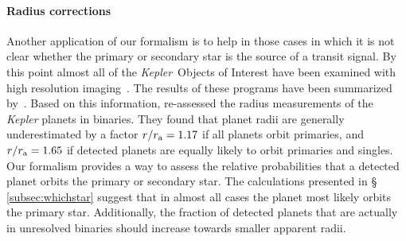 \documentclass[12pt,modern]{aastex61}
\renewcommand{\a}{_{\rm a}}
\begin{document}
\paragraph{Radius corrections} Another application of our formalism is
to help in those cases in which it is not clear whether the primary or
secondary star is the source of a transit signal.  By this point
almost all of the {\it Kepler}\ Objects of Interest have been examined
with high resolution imaging~\citep{
  howell_speckle_2011,adams_adaptive_2012,adams_adaptive_2013,horch_observations_2012,
  horch_most_2014,lillo-box_multiplicity_2012,lillo-box_high-resolution_2014,dressing_adaptive_2014,
  law_robotic_2014,cartier_revision_2015,everett_high-resolution_2015,gilliland_hubble_2015,
  wang_influence_2015,wang_influence_2015-1,baranec_robo-ao_2016,ziegler_robo-ao_2017}.
The results of these programs have been summarized
by~\citet{furlan_kepler_2017}. Based on this information,
\citet{hirsch_assessing_2017} re-assessed the radius measurements of
the {\it Kepler} planets in binaries. They found that planet radii are
generally underestimated by a factor $r/r\a = 1.17$ if all planets
orbit primaries, and $r/r\a = 1.65$ if detected planets are equally
likely to orbit primaries and singles.  Our formalism provides a way
to assess the relative probabilities that a detected planet orbits the
primary or secondary star.  The calculations presented in
\S\,\ref{subsec:whichstar} suggest that in almost all cases the planet
most likely orbits the primary star.  Additionally, the fraction of
detected planets that are actually in unresolved binaries should
increase towards smaller apparent radii.




\newpage



\newpage
                            
 
\end{document}
